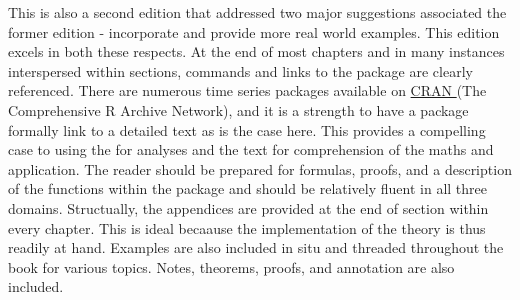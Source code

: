 \documentclass[bookreview]{jss}
\begin{document}
This is also a second edition that addressed two major suggestions associated the former edition - incorporate  and provide more real world examples. This edition excels in both these respects. At the end of most chapters and in many instances interspersed within sections,  commands and links to the package  are clearly referenced. There are numerous time series packages available on \href{https://cran.r-project.org/mirrors.html}{CRAN }(The Comprehensive R Archive Network), and it is a strength to have a package formally link to a detailed text as is the case here. This provides a compelling case to using the  for analyses and the text for comprehension of the maths and application. The reader should be prepared for formulas, proofs, and a description of the functions within the  package  and should be relatively fluent in all three domains. Structually, the appendices are provided at the end of section within every chapter. This is ideal becaause the implementation of the theory is thus readily at hand. Examples are also included in situ and threaded throughout the book for various topics. Notes, theorems, proofs, and annotation are also included.  \newline
\end{document}
